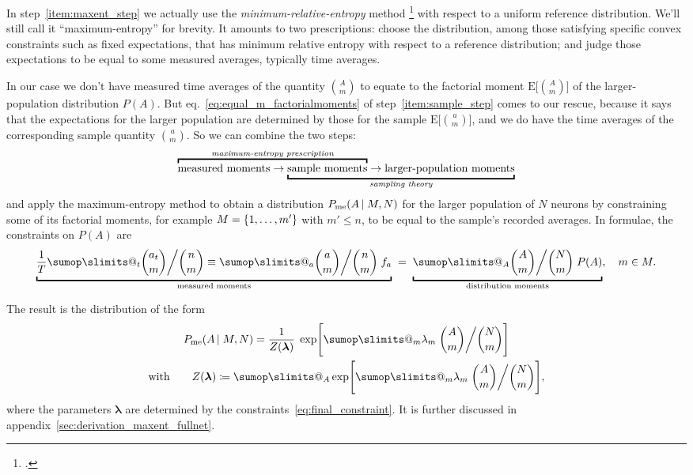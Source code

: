 \documentclass[\ifafour a4paper,12pt,\else a5paper,10pt,\fi%
onecolumn,oneside,article,%
british%
]{memoir}
\makeatletter
\theoremstyle{remark}
\theoremstyle{innote}
\def\sum{\DOTSI\sumop\slimits@}
\newcommand*{\citep}{\footcites}
\newcommand*{\defd}{\coloneqq}
\renewcommand*{\le}{\leqslant}%
\DeclarePairedDelimiter\set{\{}{\}}
\newcommand*{\E}{\mathrm{E}}
\renewcommand*{\|}{\nonscript\,\vert\nonscript\;\mathopen{}}
\newcommand*{\sect}{\S}%
\newcommand*{\eqn}{eq.}%
\newcommand*{\yAv}{A}
\newcommand*{\yav}{a}
\newcommand*{\yff}{f}
\newcommand*{\ya}{\yav}%
\newcommand*{\yA}{\yAv}%
\newcommand*{\yll}{\bm{\lambda}}
\newcommand*{\yl}{\lambda}
\newcommand*{\px}{P_{\text{me}}}
\newcommand*{\pxxx}{P}
\makeatother
\begin{document}
\medskip


In step~\ref{item:maxent_step} we actually use the
\emph{minimum-relative-entropy} method
\citep{hobsonetal1973,csiszar1985}[\sect~5.2.2]{sivia1996_r2006} with
respect to a uniform reference distribution. We'll still call it
\enquote{maximum-entropy} for brevity. It amounts to two prescriptions:
choose the distribution, among those satisfying specific convex constraints
such as fixed expectations, that has minimum relative entropy with respect
to a reference distribution; and judge those expectations to be equal to
some measured averages, typically time averages.

In our case we don't have measured time averages of the quantity
$\binom{\yA}{m}$ to equate to the factorial moment
$\E\bigl[\binom{\yA}{m}\bigr]$ of the larger-population distribution
$\pxxx(\yA)$. But \eqn~\eqref{eq:equal_m_factorialmoments} of
step~\ref{item:sample_step} comes to our rescue, because it says that the
expectations for the larger population are determined by those for the sample
$\E\bigl[\binom{\ya}{m}\bigr]$, and we do have the time averages of the
corresponding sample quantity $\binom{\ya}{m}$. So we can combine the two
steps:
\begin{equation*}
  \label{eq:chain_prescription_moments}
  \mathrlap{\overbracket{\phantom{\text{measured moments} \rightarrow
        \text{sample moments}}}^{\textit{maximum-entropy prescription}}}
  \text{measured moments} \rightarrow
        \underbracket{\text{sample moments}
  \rightarrow
    \text{larger-population moments}}_{\textit{sampling theory}}
\end{equation*}
and apply the maximum-entropy method to obtain a distribution
$\px(\yA \| M, N)$ for the larger population of $N$ neurons by constraining some
of its factorial moments, for example $M=\set{1,\dotsc,m'}$ with $m'\le n$,
to be equal to the sample's recorded averages. In formulae, the constraints
on $\pxxx(\yA)$ are
\begin{equation}
  \label{eq:final_constraint}
\underbracket{\frac{1}{T}\sum_{t}\binom{\ya_{t}}{m}\bigg/\binom{n}{m}
  \equiv
   \sum_{\ya}
  \binom{\ya}{m}\bigg/  \binom{n}{m} \; \yff_{\ya}}_{\text{measured moments}}
  \mathrel{\;=\;}
   \underbracket{\sum_{\yA}
     \binom{\yA}{m}\bigg/  \binom{N}{m} \; \pxxx(\yA)}_{\text{distribution moments}},
   \quad m\in M.
\end{equation}

The result is the
distribution of the form
\begin{equation}
  \label{eq:app_maxent_pop_first}
  \begin{gathered}
  \px(\yA \| M, N)  = \frac{1}{Z(\yll)}\;
  \exp\Biggl[\sum_{m}\yl_{m}\;
  \binom{\yA}{m}\bigg/\binom{N}{m}
  \Biggr]
  \\
\text{with}\qquad  Z(\yll)\defd \sum_{\yA}
  \exp\Biggl[\sum_{m}\yl_{m}\;
  \binom{\yA}{m}\bigg/\binom{N}{m}
  \Biggr],
\end{gathered}
\end{equation}
where the parameters $\yll$ are determined by the
constraints~\eqref{eq:final_constraint}. It is further discussed in
appendix~\ref{sec:derivation_maxent_fullnet}.
\end{document}
